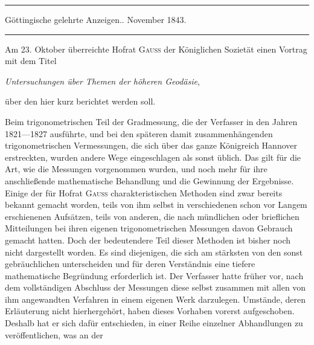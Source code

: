\begin{center}
\rule{.85\textwidth}{.3pt}\par
Göttingische gelehrte Anzeigen.. November 1843.\par
\rule{.85\textwidth}{.3pt}
\end{center}
\hspace*{\parindent}Am 23. Oktober überreichte Hofrat \textsc{Gauss} der Königlichen Sozietät einen Vortrag mit dem Titel
\begin{center}\textit{Untersuchungen über Themen der höheren Geodäsie},\end{center}
\noindent über den hier kurz berichtet werden soll.

Beim trigonometrischen Teil der Gradmessung, die der Verfasser in den Jahren 1821---1827 ausführte, und bei den späteren damit zusammenhängenden trigonometrischen Vermessungen, die sich über das ganze Königreich Hannover erstreckten, wurden andere Wege eingeschlagen als sonst üblich. Das gilt für die Art, wie die Messungen vorgenommen wurden, und noch mehr für ihre anschließende mathematische Behandlung und die Gewinnung der Ergebnisse. Einige der für Hofrat \textsc{Gauss} charakteristischen Methoden sind zwar bereits bekannt gemacht worden, teils von ihm selbst in verschiedenen schon vor Langem erschienenen Aufsätzen, teils von anderen, die nach mündlichen oder brieflichen Mitteilungen bei ihren eigenen trigonometrischen Messungen davon Gebrauch gemacht hatten. Doch der bedeutendere Teil dieser Methoden ist bisher noch nicht dargestellt worden. Es sind diejenigen, die sich am stärksten von den sonst gebräuchlichen unterscheiden und für deren Verständnis eine tiefere mathematische Begründung erforderlich ist. Der Verfasser hatte früher vor, nach dem vollständigen Abschluss der Messungen diese selbst zusammen mit allen von ihm angewandten Verfahren in einem eigenen Werk darzulegen. Umstände, deren Erläuterung nicht hierhergehört, haben dieses Vorhaben vorerst aufgeschoben. Deshalb hat er sich dafür entschieden, in einer Reihe einzelner Abhandlungen zu veröffentlichen, was an der %
